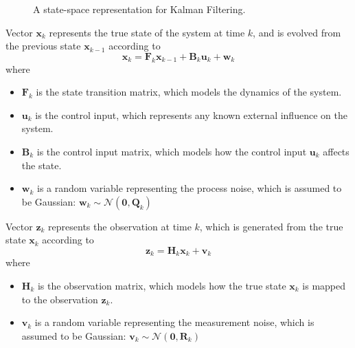 \documentclass[10pt,UTF8]{article}
\theoremstyle{definition}
\newtheorem{definition inner}{Definition}[section]
\theoremstyle{definition}
\newtheorem{theorem inner}{Theorem}[section]
\theoremstyle{definition}
\newtheorem*{proof inner}{\textit{Proof}}
\theoremstyle{plain}
\newtheorem{tip inner}{Tip}[section]
\theoremstyle{remark}
\begin{document}
\begin{figure}[H]
  \caption{A state-space representation for Kalman Filtering.}
\end{figure}

Vector \(\bm{x}_k\) represents the true state of the system at time \(k\),
and is evolved from the previous state \(\bm{x}_{k-1}\) according to
\begin{equation*}
  \bm{x}_k = \bm{F}_k \bm{x}_{k-1} + \bm{B}_k \bm{u}_k + \bm{w}_k
\end{equation*}
where
\begin{itemize}
  \item \(\bm{F}_k\) is the state transition matrix,
    which models the dynamics of the system.
  \item \(\bm{u}_k\) is the control input, which represents any known
    external influence on the system.
  \item \(\bm{B}_k\) is the control input matrix,
    which models how the control input \(\bm{u}_k\) affects the state.
  \item \(\bm{w}_k\) is a random variable representing the process noise,
    which is assumed to be Gaussian:
    \(\bm{w}_k \sim \mathcal{N}(\mathbf{0}, \bm{Q}_k)\)
\end{itemize}
Vector \(\bm{z}_k\) represents the observation at time \(k\),
which is generated from the true state \(\bm{x}_k\) according to
\begin{equation*}
  \bm{z}_k = \bm{H}_k \bm{x}_k + \bm{v}_k
\end{equation*}
where
\begin{itemize}
  \item \(\bm{H}_k\) is the observation matrix,
    which models how the true state \(\bm{x}_k\) is mapped to the
    observation \(\bm{z}_k\).
  \item \(\bm{v}_k\) is a random variable representing the measurement noise,
    which is assumed to be Gaussian:
    \(\bm{v}_k \sim \mathcal{N}(\mathbf{0}, \bm{R}_k)\)
\end{itemize}
\end{document}
